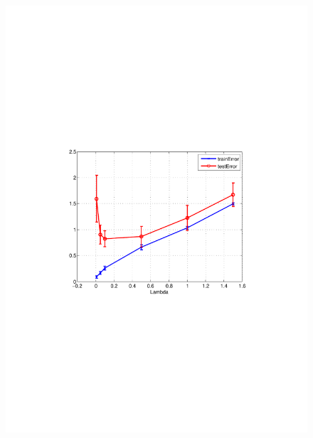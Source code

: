 \begin{figure}[h]
\begin{minipage}{\textwidth}
  \begin{minipage}[b]{0.45\textwidth}
    \centering
    \includegraphics[clip, trim=4cm 9.2cm 3.5cm 9cm, width=\textwidth]{figures/ALS_lambda.pdf}
    

\end{minipage}
\end{minipage}
\end{figure}
